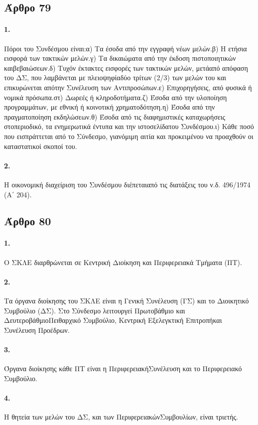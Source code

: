 \documentclass[a4paper,oneside, 10pt]{book}
\begin{document}
\subsection*{ Άρθρο 79 }
\paragraph { 1. } Πόροι του Συνδέσμου είναι:α) Τα έσοδα από την εγγραφή νέων μελών.β) Η ετήσια εισφορά των τακτικών μελών.γ) Τα δικαιώματα από την έκδοση πιστοποιητικών καιβεβαιώσεων.δ) Τυχόν έκτακτες εισφορές των τακτικών μελών, μετάαπό απόφαση του ΔΣ, που λαμβάνεται με πλειοψηφίαδύο τρίτων (2/3) των μελών του και επικυρώνεται απότην Συνέλευση των Αντιπροσώπων.ε) Επιχορηγήσεις, από φυσικά ή νομικά πρόσωπα.στ) Δωρεές ή κληροδοτήματα.ζ) Έσοδα από την υλοποίηση προγραμμάτων, με εθνική ή κοινοτική χρηματοδότηση.η) Έσοδα από την πραγματοποίηση εκδηλώσεων.θ) Έσοδα από τις διαφημιστικές καταχωρήσεις στοπεριοδικό, τα ενημερωτικά έντυπα και την ιστοσελίδατου Συνδέσμου.ι) Κάθε ποσό που εισπράττεται από το Σύνδεσμο, γιανόμιμη αιτία και προκειμένου να προαχθούν οι καταστατικοί σκοποί του.
\paragraph { 2. } Η οικονομική διαχείριση του Συνδέσμου διέπεταιαπό τις διατάξεις του ν.δ. 496/1974 (Α΄ 204).
\subsection*{ Άρθρο 80 }
\paragraph { 1. } Ο ΣΚΛΕ διαρθρώνεται σε Κεντρική Διοίκηση και Περιφερειακά Τμήματα (ΠΤ).
\paragraph { 2. } Τα όργανα διοίκησης του ΣΚΛΕ είναι η Γενική Συνέλευση (ΓΣ) και το Διοικητικό Συμβούλιο (ΔΣ). Στο Σύνδεσμο λειτουργεί Πρωτοβάθμιο και ΔευτεροβάθμιοΠειθαρχικό Συμβούλιο, Κεντρική Εξελεγκτική Επιτροπήκαι Συνέλευση Προέδρων.
\paragraph { 3. } Όργανα διοίκησης κάθε ΠΤ είναι η ΠεριφερειακήΣυνέλευση και το Περιφερειακό Συμβούλιο.
\paragraph { 4. } Η θητεία των μελών του ΔΣ, και των ΠεριφερειακώνΣυμβουλίων, είναι τριετής.
\end{document}
